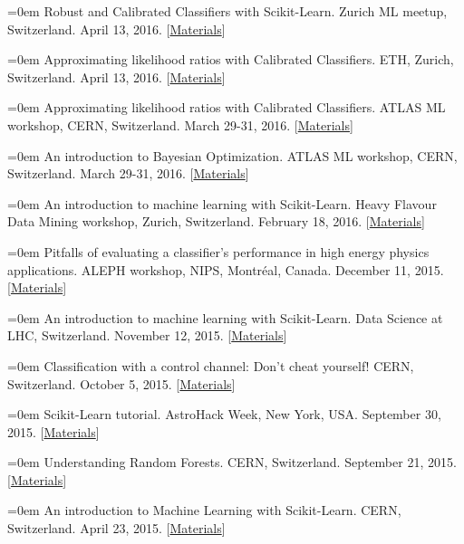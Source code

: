 \documentclass{scrartcl}
\newcommand{\MarginText}[1]{\marginpar{\raggedleft\itshape\small#1}}
\newcommand{\NewPublication}[4]{\noindent\hangindent=0em\hangafter=0 \MarginText{\color{black} #1}{\footnotesize [{\color{Maroon}#2}]} #3 {\footnotesize\color{gray}#4}\vspace{0.5em}}
\begin{document}
\begin{cv}{}
\NewPublication{}{25}{Robust and Calibrated Classifiers with Scikit-Learn.}{%
Zurich ML meetup, Switzerland.
April 13, 2016.
[\href{https://github.com/glouppe/tutorials-scikit-learn}{Materials}]}

\NewPublication{}{24}{Approximating likelihood ratios with Calibrated Classifiers.}{%
ETH, Zurich, Switzerland.
April 13, 2016.
[\href{https://github.com/glouppe/talk-approximating-likelihood-ratios-with-classifiers}{Materials}]}

\NewPublication{}{23}{Approximating likelihood ratios with Calibrated Classifiers.}{%
ATLAS ML workshop, CERN, Switzerland.
March 29-31, 2016.
[\href{https://github.com/glouppe/talk-approximating-likelihood-ratios-with-classifiers}{Materials}]}

\NewPublication{}{22}{An introduction to Bayesian Optimization.}{%
ATLAS ML workshop, CERN, Switzerland.
March 29-31, 2016.
[\href{https://github.com/glouppe/talk-bayesian-optimisation}{Materials}]}

\NewPublication{}{21}{An introduction to machine learning with Scikit-Learn.}{%
Heavy Flavour Data Mining workshop, Zurich, Switzerland.
February 18, 2016.
[\href{https://github.com/glouppe/tutorial-scikit-learn}{Materials}]}

\NewPublication{2015}{20}{Pitfalls of evaluating a classifier’s performance in high energy physics applications.}{%
ALEPH workshop, NIPS, Montr\'eal, Canada.
December 11, 2015.
[\href{https://github.com/glouppe/talk-aleph-workshop2015}{Materials}]}

\NewPublication{}{19}{An introduction to machine learning with Scikit-Learn.}{%
Data Science at LHC, Switzerland.
November 12, 2015.
[\href{https://github.com/glouppe/tutorial-sklearn-dslhc2015}{Materials}]}

\NewPublication{}{18}{Classification with a control channel: Don't cheat yourself!}{%
CERN, Switzerland.
October 5, 2015.
[\href{https://github.com/glouppe/talk-classification-control-channel}{Materials}]}

\NewPublication{}{17}{Scikit-Learn tutorial.}{%
AstroHack Week, New York, USA.
September 30, 2015.
[\href{https://github.com/AstroHackWeek/AstroHackWeek2015}{Materials}]}

\NewPublication{}{16}{Understanding Random Forests.}{%
CERN, Switzerland.
September 21, 2015.
[\href{https://github.com/glouppe/talk-pydata2015}{Materials}]}

\NewPublication{}{15}{An introduction to Machine Learning with Scikit-Learn.}{%
CERN, Switzerland.
April 23, 2015.
[\href{https://github.com/glouppe/tutorial-sklearn-lhcb}{Materials}]}


\end{cv}
\end{document}
